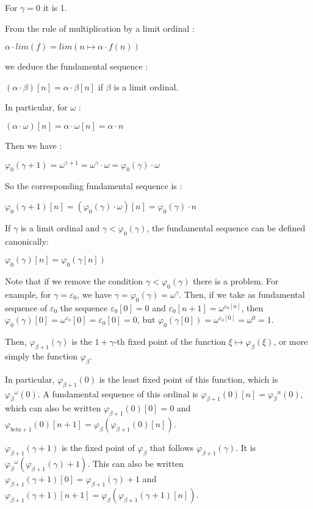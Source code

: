 \documentclass[10pt]{article}
\begin{document}
For \( \gamma = 0 \) it is 1.

From the rule of multiplication by a limit ordinal :

\( \alpha \cdot lim(f) = lim (n \mapsto \alpha \cdot f(n)) \)

we deduce the fundamental sequence :

\( (\alpha \cdot \beta)[n] = \alpha \cdot \beta[n] \)
if \( \beta \) is a limit ordinal.

In particular, for \( \omega \) :

\( (\alpha \cdot \omega)[n] = \alpha \cdot \omega[n] = \alpha \cdot n \)

Then we have :

\( \varphi_0(\gamma+1) = \omega^{\gamma+1} = \omega^\gamma \cdot \omega = \varphi_0(\gamma) \cdot \omega \)

So the corresponding fundamental sequence is : 

\( \varphi_0(\gamma+1)[n] = (\varphi_0(\gamma) \cdot \omega)[n] = \varphi_0(\gamma) \cdot n \)

If \( \gamma \) is a limit ordinal and \( \gamma < \varphi_0(\gamma) \), the fundamental sequence can be defined canonically:

\( \varphi_0(\gamma)[n] = \varphi_0(\gamma[n]) \)

Note that if we remove the condition \( \gamma < \varphi_0(\gamma) \) there is a problem. For example, for \( \gamma = \varepsilon_0 \), we have \( \gamma = \varphi_0(\gamma) = \omega^\gamma \). Then, if we take as fundamental sequence of \( \varepsilon_0 \) the sequence \( \varepsilon_0[0] = 0 \)  and \( \varepsilon_0[n+1] = \omega^{\varepsilon_0[n]} \), then \( \varphi_0(\gamma)[0] = \omega^{\varepsilon_0}[0] = \varepsilon_0[0] = 0 \), but \( \varphi_0(\gamma[0]) = \omega^{\varepsilon_0[0]} = \omega^0 = 1 \).

Then, \( \varphi_{\beta+1}(\gamma) \) is the \(1+\gamma\)-th fixed point of the function \( \xi \mapsto \varphi_\beta(\xi) \), or more simply the function \( \varphi_\beta \).

In particular, \( \varphi_{\beta+1}(0) \) is the least fixed point of this function, which is \( {\varphi_\beta}^\omega(0) \). A fundamental sequence of this ordinal is \( \varphi_{\beta+1}(0)[n] = {\varphi_\beta}^n(0) \), which can also be written \( \varphi_{\beta+1}(0)[0] = 0 \) and \( \varphi_{beta+1}(0)[n+1] = \varphi_\beta(\varphi_{\beta+1}(0)[n]) \).

\( \varphi_{\beta+1}(\gamma+1) \) is the fixed point of \( \varphi_\beta \) that follows \( \varphi_{\beta+1}(\gamma) \). It is \( {\varphi_\beta}^\omega(\varphi_{\beta+1}(\gamma)+1) \). This can also be written \( \varphi_{\beta+1}(\gamma+1)[0] = \varphi_{\beta+1}(\gamma)+1 \) and \( \varphi_{\beta+1}(\gamma+1)[n+1] = \varphi_\beta(\varphi_{\beta+1}(\gamma+1)[n]) \).
\end{document}
